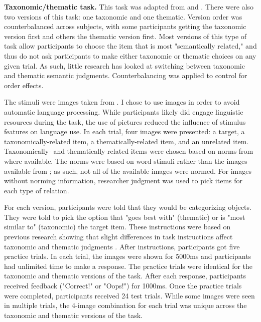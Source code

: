 \documentclass[../dissertation.tex]{subfiles}
\begin{document}
\textbf{Taxonomic/thematic task.} This task was adapted from \citet{Murphy2001} and \citet{Kalenine2009}. There were also two versions of this task: one taxonomic and one thematic. Version order was counterbalanced across subjects, with some participants getting the taxonomic version first and others the thematic version first. Most versions of this type of task allow participants to choose the item that is most "semantically related," and thus do not ask participants to make either taxonomic or thematic choices on any given trial. As such, little research has looked at switching between taxonomic and thematic semantic judgments. Counterbalancing was applied to control for order effects. \par
The stimuli were images taken from \citet{Konkle2010}. I chose to use images in order to avoid automatic language processing. While participants likely did engage linguistic resources during the task, the use of pictures reduced the influence of stimulus features on language use. In each trial, four images were presented: a target, a taxonomically-related item, a thematically-related item, and an unrelated item. Taxonomically- and thematically-related items were chosen based on norms from \citet{Landrigan2016} where available. The \citet{Landrigan2016} norms were based on word stimuli rather than the images available from \citet{Konkle2010}; as such, not all of the available images were normed. For images without norming information, researcher judgment was used to pick items for each type of relation. \par
For each version, participants were told that they would be categorizing objects. They were told to pick the option that "goes best with" (thematic) or is "most similar to" (taxonomic) the target item. These instructions were based on previous research showing that slight differences in task instructions affect taxonomic and thematic judgments \citep{Lin2001}. After instructions, participants got five practice trials. In each trial, the images were shown for 5000ms and participants had unlimited time to make a response. The practice trials were identical for the taxonomic and thematic versions of the task. After each response, participants received feedback ("Correct!" or "Oops!") for 1000ms. Once the practice trials were completed, participants received 24 test trials. While some images were seen in multiple trials, the 4-image combination for each trial was unique across the taxonomic and thematic versions of the task.
\end{document}
